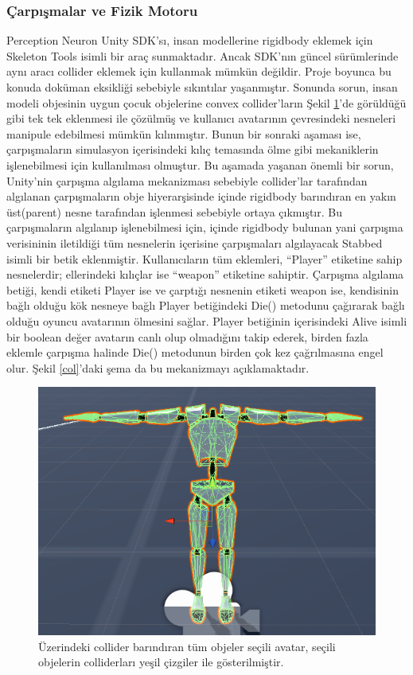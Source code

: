\documentclass[a4paper, 12pt, titlepage]{article}
\begin{document}
\subsubsection{Çarpışmalar ve Fizik Motoru}
Perception Neuron Unity SDK’sı, insan modellerine rigidbody eklemek için Skeleton Tools isimli bir
araç sunmaktadır. Ancak SDK’nın güncel sürümlerinde aynı aracı collider eklemek için kullanmak
mümkün değildir. Proje boyunca bu konuda doküman eksikliği sebebiyle sıkıntılar yaşanmıştır.
Sonunda sorun, insan modeli objesinin uygun çocuk objelerine convex collider’ların Şekil \ref{c}’de
görüldüğü gibi tek tek eklenmesi ile çözülmüş ve kullanıcı avatarının çevresindeki nesneleri
manipule edebilmesi mümkün kılınmıştır. Bunun bir sonraki aşaması ise, çarpışmaların simulasyon
içerisindeki kılıç temasında ölme gibi mekaniklerin işlenebilmesi için kullanılması olmuştur. Bu
aşamada yaşanan önemli bir sorun, Unity’nin çarpışma algılama mekanizması sebebiyle collider’lar
tarafından algılanan çarpışmaların obje hiyerarşisinde içinde rigidbody barındıran en yakın
üst(parent) nesne tarafından işlenmesi sebebiyle ortaya çıkmıştır. Bu çarpışmaların algılanıp
işlenebilmesi için, içinde rigidbody bulunan yani çarpışma verisininin iletildiği tüm nesnelerin
içerisine çarpışmaları algılayacak Stabbed isimli bir betik eklenmiştir. Kullanıcıların tüm
eklemleri, “Player” etiketine sahip nesnelerdir; ellerindeki kılıçlar ise “weapon” etiketine
sahiptir. Çarpışma algılama betiği, kendi etiketi Player ise ve çarptığı nesnenin etiketi weapon
ise, kendisinin bağlı olduğu kök nesneye bağlı Player betiğindeki Die() metodunu çağırarak bağlı
olduğu oyuncu avatarının ölmesini sağlar. Player betiğinin içerisindeki Alive isimli bir boolean
değer avatarın canlı olup olmadığını takip ederek, birden fazla eklemle çarpışma halinde Die()
metodunun birden çok kez çağrılmasına engel olur. Şekil \ref{col}’daki şema da bu mekanizmayı
açıklamaktadır.

\begin{figure}
    \centering
        \includegraphics[width=6in]{images/c}
    \caption{Üzerindeki collider barındıran tüm objeler seçili avatar, seçili objelerin
             colliderları yeşil çizgiler ile gösterilmiştir.}
    \label{c}
\end{figure}
\end{document}
